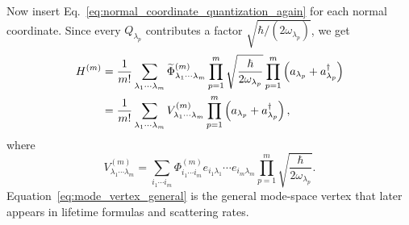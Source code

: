 Now insert Eq.~\eqref{eq:normal_coordinate_quantization_again} for each normal coordinate. Since every $Q_{\lambda_p}$ contributes a factor $\sqrt{\hbar/(2\omega_{\lambda_p})}$, we get
\begin{align}
    H^{(m)}
    &= \frac{1}{m!}\sum_{\lambda_1\cdots \lambda_m}
       \widetilde\Phi^{(m)}_{\lambda_1\cdots \lambda_m}
       \prod_{p=1}^m \sqrt{\frac{\hbar}{2\omega_{\lambda_p}}}
       \prod_{p=1}^m \left( a_{\lambda_p}+a_{\lambda_p}^\dagger \right) \\
    &= \frac{1}{m!}\sum_{\lambda_1\cdots \lambda_m}
       V^{(m)}_{\lambda_1\cdots \lambda_m}
       \prod_{p=1}^m \left( a_{\lambda_p}+a_{\lambda_p}^\dagger \right),
    \label{eq:mode_hamiltonian_quantized}
\end{align}
where
\begin{equation}
    V^{(m)}_{\lambda_1\cdots \lambda_m}
    =
    \sum_{i_1\cdots i_m}
    \Phi^{(m)}_{i_1\cdots i_m}
    e_{i_1\lambda_1}\cdots e_{i_m\lambda_m}
    \prod_{p=1}^m \sqrt{\frac{\hbar}{2\omega_{\lambda_p}}}.
    \label{eq:mode_vertex_general}
\end{equation}
Equation~\eqref{eq:mode_vertex_general} is the general mode-space vertex that later appears in lifetime formulas and scattering rates.

